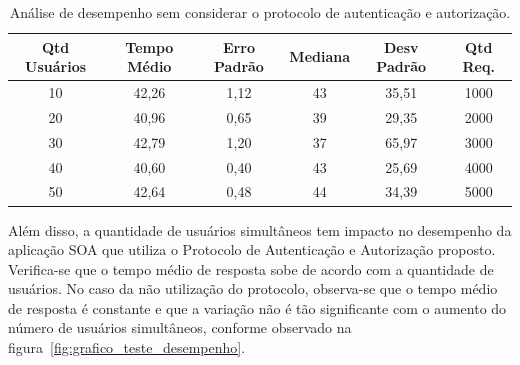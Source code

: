 \begin{table}[h]
\begin{center}
\begin{tabular}{|c|c|c|c|c|c|}
\hline
Qtd Usuários    & Tempo Médio    & Erro Padrão & Mediana  & Desv Padrão & Qtd Req. \\ \hline
10              & 42,26          & 1,12        & 43       & 35,51       &  1000       \\ \hline
20              & 40,96          & 0,65        & 39       & 29,35       &  2000       \\ \hline
30              & 42,79          & 1,20        & 37       & 65,97       &  3000       \\ \hline
40              & 40,60          & 0,40        & 43       & 25,69       &  4000       \\ \hline
50              & 42,64          & 0,48        & 44       & 34,39       &  5000       \\ \hline
\end{tabular}\caption {An\'{a}lise de desempenho sem considerar o protocolo de autenticação e autorização.}\label{tb:estatistica_sem_cripto}
\end{center}
\end{table}

Al\'{e}m disso, a quantidade de usuários simultâneos tem impacto no desempenho da aplicação SOA que utiliza o Protocolo de Autenticação e Autorização proposto. Verifica-se que o tempo médio de resposta sobe de acordo com a quantidade de usuários. No caso da não utilização do protocolo, observa-se que o tempo médio de resposta é constante e que a variação não \'{e} tão significante com o aumento do número de usuários simultâneos, conforme observado na figura~\ref{fig:grafico_teste_desempenho}.

